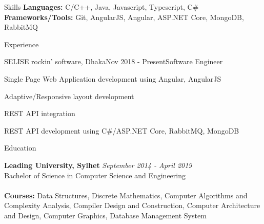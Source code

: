 \documentclass{resume}
\begin{document}

\begin{rSection}{Skills}
{\bf Languages:} C/C++, Java, Javascript, Typescript, C\#\\
{\bf Frameworks/Tools:} Git, AngularJS, Angular, ASP.NET Core, MongoDB, RabbitMQ
\end{rSection}


\begin{rSection}{Experience}

\begin{rSubsection}{SELISE rockin' software, Dhaka}{Nov 2018 - Present}{Software Engineer}{}
\item Single Page Web Application development using Angular, AngularJS
\item Adaptive/Responsive layout development
\item REST API integration
\item REST API development using C\#/ASP.NET Core, RabbitMQ, MongoDB
\end{rSubsection}

\end{rSection}


\begin{rSection}{Education}

{\bf Leading University, Sylhet} \hfill {\em September 2014 - April 2019}
\\ Bachelor of Science in Computer Science and Engineering \\
\\{\bf Courses:} Data Structures, Discrete Mathematics, Computer Algorithms and Complexity Analysis, Compiler Design and Construction, Computer Architecture and Design, Computer Graphics, Database Management System 
\end{rSection}


\end{document}

